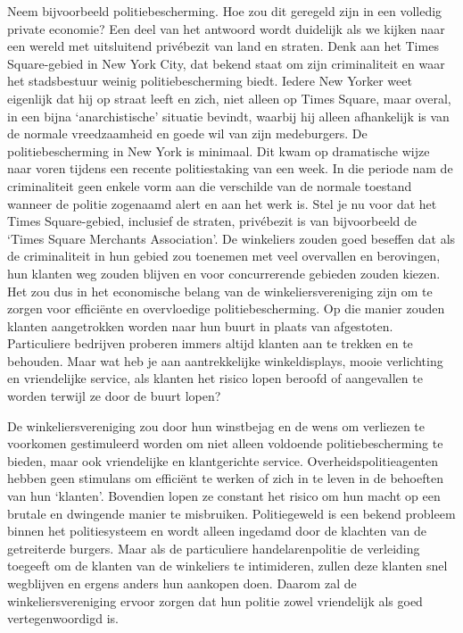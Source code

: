\documentclass[
  a5paper,
  smalldemyvopaper,10pt,twoside,onecolumn,openright,extrafontsizes,hidelinks]{memoir}
\begin{document}
Neem bijvoorbeeld politiebescherming. Hoe zou dit geregeld zijn in een
volledig private economie? Een deel van het antwoord wordt duidelijk als
we kijken naar een wereld met uitsluitend privébezit van land en
straten. Denk aan het Times Square-gebied in New York City, dat bekend
staat om zijn criminaliteit en waar het stadsbestuur weinig
politiebescherming biedt. Iedere New Yorker weet eigenlijk dat hij op
straat leeft en zich, niet alleen op Times Square, maar overal, in een
bijna `anarchistische' situatie bevindt, waarbij hij alleen afhankelijk
is van de normale vreedzaamheid en goede wil van zijn medeburgers. De
politiebescherming in New York is minimaal. Dit kwam op dramatische
wijze naar voren tijdens een recente politiestaking van een week. In die
periode nam de criminaliteit geen enkele vorm aan die verschilde van de
normale toestand wanneer de politie zogenaamd alert en aan het werk is.
Stel je nu voor dat het Times Square-gebied, inclusief de straten,
privébezit is van bijvoorbeeld de `Times Square Merchants Association'.
De winkeliers zouden goed beseffen dat als de criminaliteit in hun
gebied zou toenemen met veel overvallen en berovingen, hun klanten weg
zouden blijven en voor concurrerende gebieden zouden kiezen. Het zou dus
in het economische belang van de winkeliersvereniging zijn om te zorgen
voor efficiënte en overvloedige politiebescherming. Op die manier zouden
klanten aangetrokken worden naar hun buurt in plaats van afgestoten.
Particuliere bedrijven proberen immers altijd klanten aan te trekken en
te behouden. Maar wat heb je aan aantrekkelijke winkeldisplays, mooie
verlichting en vriendelijke service, als klanten het risico lopen
beroofd of aangevallen te worden terwijl ze door de buurt lopen?

De winkeliersvereniging zou door hun winstbejag en de wens om verliezen
te voorkomen gestimuleerd worden om niet alleen voldoende
politiebescherming te bieden, maar ook vriendelijke en klantgerichte
service. Overheidspolitieagenten hebben geen stimulans om efficiënt te
werken of zich in te leven in de behoeften van hun `klanten'. Bovendien
lopen ze constant het risico om hun macht op een brutale en dwingende
manier te misbruiken. Politiegeweld is een bekend probleem binnen het
politiesysteem en wordt alleen ingedamd door de klachten van de
getreiterde burgers. Maar als de particuliere handelarenpolitie de
verleiding toegeeft om de klanten van de winkeliers te intimideren,
zullen deze klanten snel wegblijven en ergens anders hun aankopen doen.
Daarom zal de winkeliersvereniging ervoor zorgen dat hun politie zowel
vriendelijk als goed vertegenwoordigd is.
\end{document}
